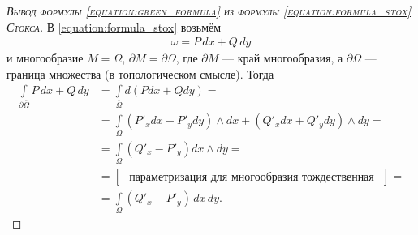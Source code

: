 \begin{proof}[\normalfont\textsc{Вывод формулы \eqref{equation:green_formula} из формулы \eqref{equation:formula_stox} Стокса}]
 В \eqref{equation:formula_stox} возьмём
 \begin{align*}
  \omega = P \, dx + Q \, dy
 \end{align*} и многообразие $M = \overline \Omega$, $\partial M = \partial \overline \Omega$, где $\partial M$ --- край многообразия, а $\partial \overline \Omega$ --- граница множества (в топологическом смысле). Тогда
 \begin{align*}
  \int\limits_{\partial \overline \Omega} P\,dx + Q\,dy &= \int\limits_{\overline \Omega} d(Pdx+Qdy) = \\
  &= \int\limits_{\Omega} (P'_x dx + P'_y dy) \land dx + (Q'_x dx + Q'_y dy) \land dy = \\
  &= \int\limits_{\Omega} (Q'_x - P'_y) dx \land dy = \\
  &= \begin{bmatrix}
   \text{ параметризация для многообразия тождественная  } 
  \end{bmatrix} = \\
  &= \int\limits_{\Omega} (Q'_x - P'_y) \,dx\,dy
 .\end{align*} 
\end{proof}

